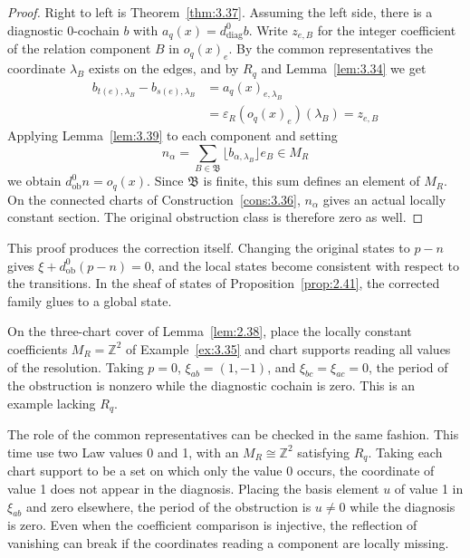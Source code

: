 \begin{proof}

Right to left is Theorem~\ref{thm:3.37}.
Assuming the left side, there is a diagnostic 0-cochain $b$ with
$a_q(x)=d_{\mathrm{diag}}^0b$.
Write $z_{e,B}$ for the integer coefficient of the relation component $B$ in
$o_q(x)_e$.
By the common representatives the coordinate $\lambda_B$ exists on the edges, and by
$R_q$ and Lemma~\ref{lem:3.34} we get
\begin{equation*}
\begin{aligned}
b_{t(e),\lambda_B}-b_{s(e),\lambda_B}
&=a_q(x)_{e,\lambda_B}\\
&=\varepsilon_R(o_q(x)_e)(\lambda_B)
=z_{e,B}
\end{aligned}
\tag{3.35}\label{eq:3.35}
\end{equation*}
Applying Lemma~\ref{lem:3.39} to each component and setting
\begin{equation*}
n_\alpha=\sum_{B\in\mathfrak{B}}
\lfloor b_{\alpha,\lambda_B}\rfloor e_B\in M_R
\tag{3.36}\label{eq:3.36}
\end{equation*}
we obtain $d_{\mathrm{ob}}^0n=o_q(x)$.
Since $\mathfrak{B}$ is finite, this sum defines an element of $M_R$.
On the connected charts of Construction~\ref{cons:3.36}, $n_\alpha$ gives an actual
locally constant section.
The original obstruction class is therefore zero as well.

\end{proof}

This proof produces the correction itself.
Changing the original states to $p-n$ gives
$\xi+d_{\mathrm{ob}}^0(p-n)=0$, and the local states become consistent with respect
to the transitions.
In the sheaf of states of Proposition~\ref{prop:2.41}, the corrected family glues to
a global state.

\begin{example}\label{ex:3.41}

On the three-chart cover of Lemma~\ref{lem:2.38}, place the locally constant
coefficients $M_R=\mathbb{Z}^2$ of Example~\ref{ex:3.35} and chart supports reading
all values of the resolution.
Taking $p=0$, $\xi_{ab}=(1,-1)$, and $\xi_{bc}=\xi_{ac}=0$, the period of the
obstruction is nonzero while the diagnostic cochain is zero. This is an example
lacking $R_q$.

The role of the common representatives can be checked in the same fashion.
This time use two Law values 0 and 1, with an $M_R\cong\mathbb{Z}^2$ satisfying
$R_q$.
Taking each chart support to be a set on which only the value 0 occurs, the
coordinate of value 1 does not appear in the diagnosis.
Placing the basis element $u$ of value 1 in $\xi_{ab}$ and zero elsewhere, the
period of the obstruction is $u\ne0$ while the diagnosis is zero.
Even when the coefficient comparison is injective, the reflection of vanishing can
break if the coordinates reading a component are locally missing.

\end{example}

